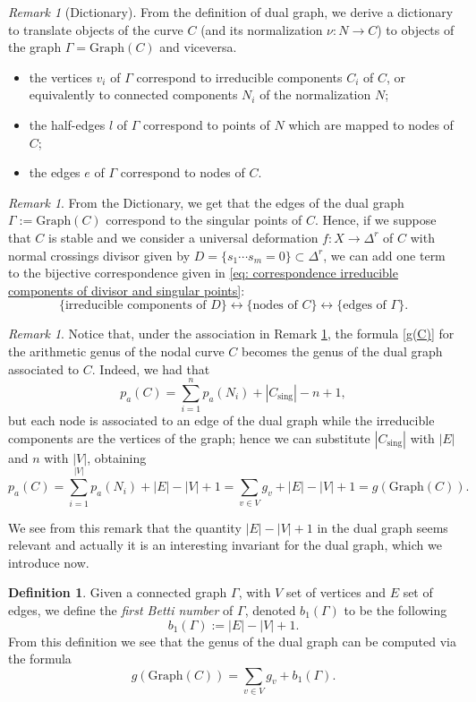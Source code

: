 \documentclass[a4paper,12 pt,titlepage,twoside]{book}
\theoremstyle{plain}
\theoremstyle{theorem}
\theoremstyle{definition}
\newtheorem{defn}[thm]{Definition}
\theoremstyle{remark}
\newtheorem{oss}[thm]{Remark}
\begin{document}
	\begin{oss}[Dictionary] \label{dictionary}
		From the definition of dual graph, we derive a dictionary to translate objects of the curve $C$ (and its normalization $\nu \colon N \rightarrow C$) to objects of the graph $\Gamma = \text{Graph}(C)$ and viceversa. \begin{itemize}
			\item the vertices $v_i$ of $\Gamma$ correspond to irreducible components $C_i$ of $C$, or equivalently to connected components $N_i$ of the normalization $N$;
			\item the half-edges $l$ of $\Gamma$ correspond to points of $N$ which are mapped to nodes of $C$;
			\item the edges $e$ of $\Gamma$ correspond to nodes of $C$.
		\end{itemize}
	\end{oss}
	\begin{oss}\label{rmk: correspondence irreducible components of divisor, singular points and edges}
		From the Dictionary, we get that the edges of the dual graph $\Gamma := \text{Graph}(C)$ correspond to the singular points of $C$. Hence, if we suppose that $C$ is stable and we consider a universal deformation $f \colon X \rightarrow \Delta^r$ of $C$ with normal crossings divisor given by $D =\{s_1 \cdots s_m=0\} \subset \Delta^r$, we can add one term to the bijective correspondence given in \eqref{eq: correspondence irreducible components of divisor and singular points}: \begin{equation}
		\{\text{irreducible components of } D\} \leftrightarrow \{\text{nodes of } C\} \leftrightarrow \{\text{edges of } \Gamma\}.
		\end{equation}
	\end{oss}
	\begin{oss}
		Notice that, under the association in Remark \ref{dictionary}, the formula \ref{g(C)} for the arithmetic genus of the nodal curve $C$ becomes the genus of the dual graph associated to $C.$ Indeed, we had that $$p_a(C) = \sum_{i=1}^n p_a(N_i) + |C_\text{sing}| - n +1,$$ but each node is associated to an edge of the dual graph while the irreducible components are the vertices of the graph; hence we can substitute $|C_\text{sing}|$ with $|E|$ and $n$ with $|V|$, obtaining $$p_a(C) = \sum_{i=1}^{|V|} p_a(N_i) + |E| - |V| +1 = \sum_{v \in V} g_v + |E| - |V| +1 = g(\text{Graph}(C)).$$
	\end{oss}
	We see from this remark that the quantity $|E|-|V|+1$ in the dual graph seems relevant and actually it is an interesting invariant for the dual graph, which we introduce now.
	\begin{defn}
		Given a connected graph $\Gamma$, with $V$ set of vertices and $E$ set of edges, we define the \emph{first Betti number} of $\Gamma$, denoted $b_1(\Gamma)$ to be the following $$b_1(\Gamma) := |E|-|V|+1.$$
		From this definition we see that the genus of the dual graph can be computed via the formula $$g(\text{Graph}(C)) = \sum_{v \in V} g_v + b_1(\Gamma).$$
	\end{defn}
\end{document}
